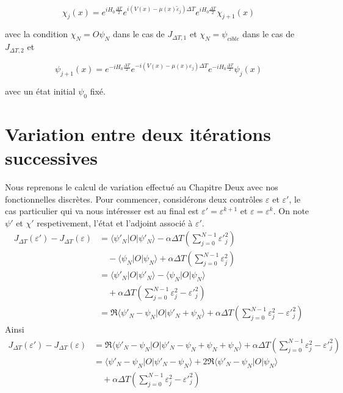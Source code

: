 \begin{equation}
\chi_j(x) = e^{iH_0\frac{\Delta T}{2}} e^{i(V(x)-\mu(x)\tilde{\varepsilon}_j)\Delta T} e^{iH_0\frac{\Delta T}{2}} \chi_{j+1}(x)
\end{equation}

avec la condition $\chi_N = O\psi_N$ dans le cas de $J_{\Delta T,1}$ et $\chi_N = \psi_{cible}$ dans le cas de $J_{\Delta T,2}$ et

\begin{equation}
\psi_{j+1}(x) = e^{-iH_0\frac{\Delta T}{2}} e^{-i(V(x)-\mu(x)\varepsilon_j)\Delta T} e^{-iH_0\frac{\Delta T}{2}} \psi_j(x)
\end{equation}

avec un état initial $\psi_0$ fixé.

\section{Variation entre deux itérations successives}
Nous reprenons le calcul de variation effectué au Chapitre Deux avec nos fonctionnelles discrètes. Pour commencer, considérons deux contrôles $\varepsilon$ et $\varepsilon'$, le cas particulier qui va nous intéresser est au final est $\varepsilon' = \varepsilon^{k+1}$ et $\varepsilon = \varepsilon^k$. On note $\psi'$ et $\chi'$ respetivement, l'état et l'adjoint associé à $\varepsilon'$.
\begin{align*}
J_{\Delta T}(\varepsilon')-J_{\Delta T}(\varepsilon) 
&=\langle \psi'_N |O|\psi'_N \rangle -\alpha \Delta T (\sum_{j=0}^{N -1} {\varepsilon'}_j^{2})\\
&\quad -\langle \psi_N |O|\psi_N \rangle +\alpha \Delta T (\sum_{j=0}^{N -1} {\varepsilon}_j^{2})\\
&=\langle \psi'_N |O|\psi'_N \rangle -\langle \psi_N |O|\psi_N \rangle \\
&\quad  +\alpha \Delta T (\sum_{j=0}^{N -1} {\varepsilon}_j^{2}-{\varepsilon'}_j^{2})\\
&= \Re\langle \psi'_N-\psi_N |O|\psi'_N+\psi_N \rangle +\alpha \Delta T (\sum_{j=0}^{N -1} \varepsilon_j^2-{\varepsilon'}_j^{2})
\end{align*}
Ainsi
\begin{align*}
J_{\Delta T}(\varepsilon')-J_{\Delta T}(\varepsilon)
&= \Re\langle \psi'_N-\psi_N |O|\psi'_N -\psi_N +\psi_N +\psi_N \rangle +\alpha \Delta T (\sum_{j=0}^{N -1} \varepsilon_j^2-{\varepsilon'}_j^{2})\\
&= \langle \psi'_N-\psi_N |O|\psi'_N-\psi_N \rangle + 2\Re \langle \psi'_N-\psi_N |O|\psi_N \rangle\\
&\quad +\alpha \Delta T (\sum_{j=0}^{N -1} \varepsilon_j^2-{\varepsilon'}_j^{2})
\end{align*}
